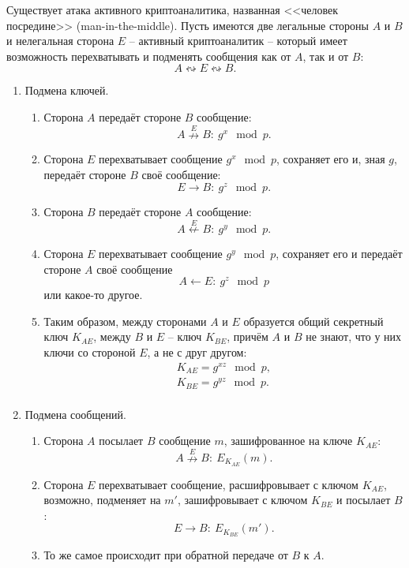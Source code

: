Существует атака активного криптоаналитика, названная <<человек посредине>> (man-in-the-middle). Пусть имеются две легальные стороны $A$ и $B$ и нелегальная сторона $E$ -- активный криптоаналитик -- который имеет возможность перехватывать и подменять сообщения как от $A$, так и от $B$:
    \[ A \leftrightsquigarrow E \leftrightsquigarrow B. \]

\begin{enumerate}
    \item Подмена ключей.
        \begin{enumerate}
            \item Сторона $A$ передаёт стороне $B$ сообщение:
                \[ A \overset{E}{\nrightarrow} B: ~ g^x \mod p. \]
            \item Сторона $E$ перехватывает сообщение $g^x \mod p$, сохраняет его и, зная $g$, передаёт стороне $B$ своё сообщение:
                \[ E \rightarrow B: ~ g^z \mod p. \]
            \item Сторона $B$ передаёт стороне $A$ сообщение:
                \[ A \overset{E}{\nleftarrow} B: ~ g^y \mod p. \]
            \item Сторона $E$ перехватывает сообщение $g^y \mod p$, сохраняет его и передаёт стороне $A$ своё сообщение
                \[ A \leftarrow E: ~ g^z \mod p \]
                или какое-то другое.
            \item Таким образом, между сторонами $A$ и $E$ образуется общий секретный ключ $K_{AE}$, между $B$ и $E$ -- ключ $K_{BE}$, причём $A$ и $B$ не знают, что у них ключи со стороной $E$, а не с друг другом:
                \[ \begin{array} {l}
                    K_{AE} = g^{xz} \mod p, \\
                    K_{BE} = g^{yz} \mod p. \\
                \end{array} \]

        \end{enumerate}
    \item Подмена сообщений.
        \begin{enumerate}
            \item Сторона $A$ посылает $B$ сообщение $m$, зашифрованное на ключе $K_{AE}$:
                \[ A \overset{E}{\nrightarrow} B: ~ E_{K_{AE}}(m). \]
            \item Сторона $E$ перехватывает сообщение, расшифровывает с ключом $K_{AE}$, возможно, подменяет на $m'$, зашифровывает с ключом $K_{BE}$ и посылает $B$:
                \[ E \rightarrow B: ~ E_{K_{BE}}(m'). \]
            \item То же самое происходит при обратной передаче от $B$ к $A$.
        \end{enumerate}
\end{enumerate}

